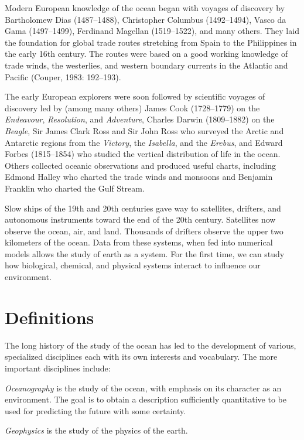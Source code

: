 Modern European knowledge of the ocean began with voyages of discovery by
Bartholomew Dias (1487--1488), Christopher Columbus (1492--1494), Vasco da Gama
(1497--1499), Ferdinand Magellan (1519--1522), and many others. They laid the
foundation for global trade routes stretching from Spain to the Philippines in
the early 16th century. The routes were based on a good working knowledge of
trade winds, the westerlies, and western boundary currents in the Atlantic and
Pacific (Couper, 1983: 192--193).

The early European explorers were soon followed by scientific voyages of
discovery led by (among many others) James Cook (1728--1779) on the
\textit{Endeavour},
\textit{Resolution}, and \textit{Adventure}, Charles Darwin (1809--1882) on the
\textit{Beagle}, Sir James Clark Ross and Sir John Ross who surveyed the
Arctic and Antarctic regions from the \textit{Victory}, the \textit{Isabella},
and the \textit{Erebus}, and Edward Forbes (1815--1854) who studied the vertical
distribution of life in the ocean. Others collected oceanic observations and
produced useful charts, including Edmond Halley who charted the trade winds and
monsoons and Benjamin Franklin who charted the Gulf Stream.

Slow ships of the 19th and 20th centuries gave way to satellites, drifters, and autonomous instruments  toward the end of the 20th century. Satellites now observe the ocean, air, and land. Thousands of drifters observe the upper two kilometers of the ocean. Data from these systems, when fed into numerical models allows the study of earth as a system.
For the first time, we can study how biological, chemical, and physical systems
interact to influence our environment.

\section{Definitions}
The long history of the study of the ocean has led to the development of
various, specialized disciplines each with its own interests and
vocabulary. The more important disciplines include:

\textit{Oceanography} is the study of the ocean, with emphasis on
its character as an environment. The goal is to obtain a description sufficiently quantitative
to be used for predicting the future with some certainty.

\textit{Geophysics} is the study of the physics of the earth.

